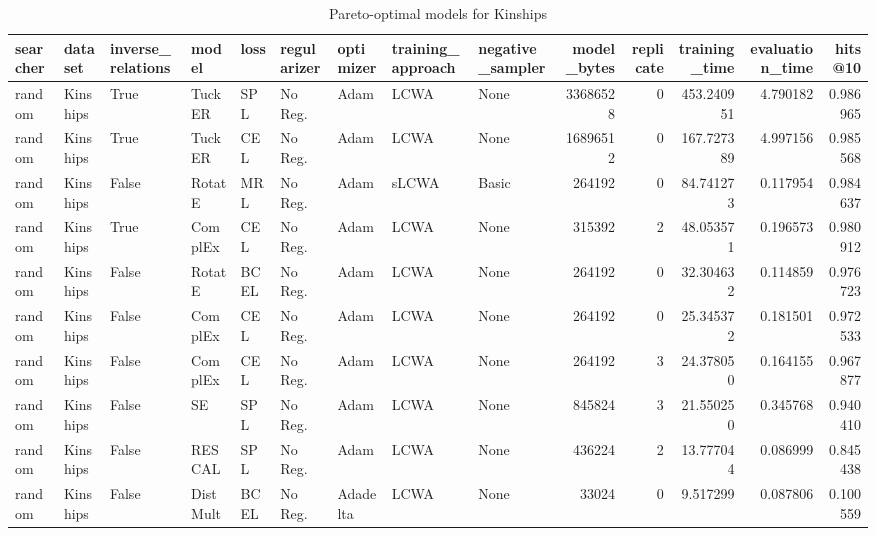 \begin{table}
\centering
\caption{Pareto-optimal models for Kinships}
\begin{tabular}{lllllllllrrrrr}
\toprule
searcher &   dataset & inverse\_relations &     model &  loss & regularizer & optimizer & training\_approach & negative\_sampler &  model\_bytes &  replicate &  training\_time &  evaluation\_time &   hits@10 \\
\midrule
  random &  Kinships &              True &    TuckER &   SPL &     No Reg. &      Adam &              LCWA &             None &     33686528 &          0 &     453.240951 &         4.790182 &  0.986965 \\
  random &  Kinships &              True &    TuckER &   CEL &     No Reg. &      Adam &              LCWA &             None &     16896512 &          0 &     167.727389 &         4.997156 &  0.985568 \\
  random &  Kinships &             False &    RotatE &   MRL &     No Reg. &      Adam &             sLCWA &            Basic &       264192 &          0 &      84.741273 &         0.117954 &  0.984637 \\
  random &  Kinships &              True &   ComplEx &   CEL &     No Reg. &      Adam &              LCWA &             None &       315392 &          2 &      48.053571 &         0.196573 &  0.980912 \\
  random &  Kinships &             False &    RotatE &  BCEL &     No Reg. &      Adam &              LCWA &             None &       264192 &          0 &      32.304632 &         0.114859 &  0.976723 \\
  random &  Kinships &             False &   ComplEx &   CEL &     No Reg. &      Adam &              LCWA &             None &       264192 &          0 &      25.345372 &         0.181501 &  0.972533 \\
  random &  Kinships &             False &   ComplEx &   CEL &     No Reg. &      Adam &              LCWA &             None &       264192 &          3 &      24.378050 &         0.164155 &  0.967877 \\
  random &  Kinships &             False &        SE &   SPL &     No Reg. &      Adam &              LCWA &             None &       845824 &          3 &      21.550250 &         0.345768 &  0.940410 \\
  random &  Kinships &             False &    RESCAL &   SPL &     No Reg. &      Adam &              LCWA &             None &       436224 &          2 &      13.777044 &         0.086999 &  0.845438 \\
  random &  Kinships &             False &  DistMult &  BCEL &     No Reg. &  Adadelta &              LCWA &             None &        33024 &          0 &       9.517299 &         0.087806 &  0.100559 \\
\bottomrule
\end{tabular}
\end{table}

